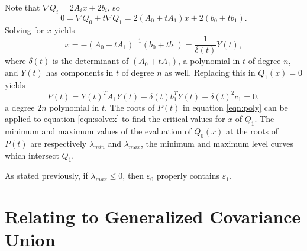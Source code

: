 Note that $\nabla Q_i=2A_ix+2b_i$, so
\begin{equation}
    0 = \nabla Q_0 + t\nabla Q_1 = 2(A_0+tA_1)x+2(b_0+tb_1).
\end{equation}
Solving for $x$ yields
\begin{equation}\label{eqn:solvex}
    x = -(A_0+tA_1)^{-1}(b_0+tb_1)=\frac{1}{\delta(t)}Y(t),
\end{equation}
where $\delta(t)$ is the determinant of $(A_0+tA_1)$, a polynomial in $t$ of degree $n$, and $Y(t)$ has components in
$t$ of degree $n$ as well. Replacing this in $Q_1(x)=0$ yields
\begin{equation}\label{eqn:poly}
    P(t) = Y(t)^TA_1Y(t)+\delta(t)b_1^TY(t)+\delta(t)^2c_1=0,
\end{equation}
a degree $2n$ polynomial in $t$. The roots of $P(t)$ in equation \ref{eqn:poly} can be applied to equation
\ref{eqn:solvex} to find the critical values for $x$ of $Q_1$. The minimum and maximum values of the evaluation of
$Q_0(x)$ at the roots of $P(t)$ are respectively $\lambda_{min}$ and $\lambda_{max}$, the minimum and maximum level
curves which intersect $Q_1$. 

As stated previously, if $\lambda_{max}\leq 0$, then $\varepsilon_0$ properly contains $\varepsilon_1$.


\section{Relating to Generalized Covariance Union}

